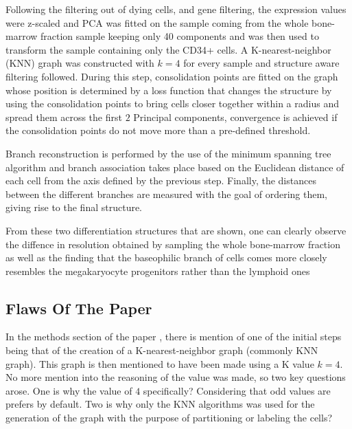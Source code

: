 \documentclass[12pt, a4paper]{article}
\begin{document}
\begin{multicols}{2}
                Following the filtering out of dying cells, and gene filtering, the expression values were z-scaled and PCA \cite{pearson_lines_1901} was fitted on the sample coming from the whole bone-marrow fraction sample keeping only 40 components and was then used to transform the sample containing only the CD34+ cells.
                A K-nearest-neighbor (KNN) graph was constructed with $k=4$ for every sample and structure aware filtering followed.
                During this step, consolidation points are fitted on the graph whose position is determined by a loss function that changes the structure by using the consolidation points to bring cells closer together within a radius and spread them across the first $2$ Principal components, convergence is achieved if the consolidation points do not move more than a pre-defined threshold.
                \newline

                Branch reconstruction is performed by the use of the minimum spanning tree algorithm and branch association takes place based on the Euclidean distance \cite{ballantine_distance_1952} of each cell from the axis defined by the previous step.
                Finally, the distances between the different branches are measured with the goal of ordering them, giving rise to the final structure.
                \newline

                From these two differentiation structures that are shown, one can clearly observe the diffence in resolution obtained by sampling the whole bone-marrow fraction as well as the finding that the baseophilic branch of cells comes more closely resembles the megakaryocyte progenitors rather than the lymphoid ones


            \subsection{Flaws Of The Paper} \label{sub:Flaws}

            In the methods section of the paper \cite{pellin_comprehensive_2019}, there is mention of one of the initial steps being that of the creation of a K-nearest-neighbor graph (commonly KNN graph). This graph is then mentioned to have been made using a K value $k=4$. No more mention into the reasoning of the value was made, so two key questions arose. One is why the value of $4$ specifically? Considering that odd values are prefers by default. Two is why only the KNN algorithms was used for the generation of the graph with the purpose of partitioning or labeling the cells?
            \newline


\end{multicols}
\end{document}
